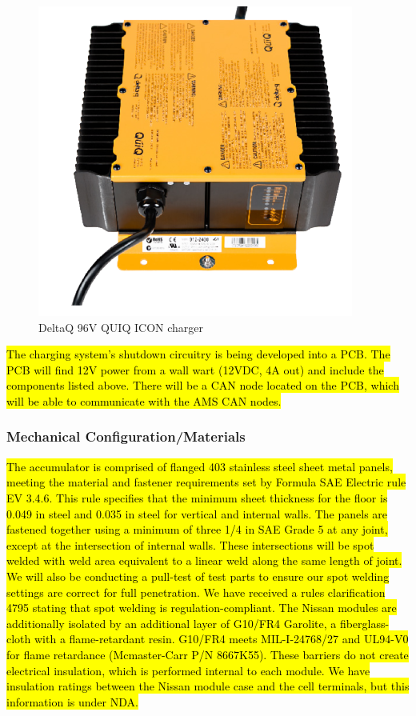 \documentclass{article}
\DeclareRobustCommand{\hlr}[1]{{\sethlcolor{red}\hl{#1}}}
\begin{document}
            \begin{figure}[H]
                \centering
                \includegraphics[width = 0.5 \textwidth]{chargepic}
                \caption{DeltaQ 96V QUIQ ICON charger}
                \label{chargepic}
            \end{figure}

            \hlr{The charging system's shutdown circuitry is being developed into a PCB. The PCB will find 12V power from a wall wart (12VDC, 4A out) and include the components listed above. There will be a CAN node located on the PCB, which will be able to communicate with the AMS CAN nodes.}

        \subsubsection{Mechanical Configuration/Materials}


            \hlr{The accumulator is comprised of flanged 403 stainless steel sheet metal panels, meeting the material and fastener requirements set by Formula SAE Electric rule EV 3.4.6. This rule specifies that the minimum sheet thickness for the floor is 0.049 in steel and 0.035 in steel for vertical and internal walls. The panels are fastened together using a minimum of three 1/4 in SAE Grade 5 at any joint, except at the intersection of internal walls. These intersections will be spot welded with weld area equivalent to a linear weld along the same length of joint. We will also be conducting a pull-test of test parts to ensure our spot welding settings are correct for full penetration. We have received a rules clarification 4795 stating that spot welding is regulation-compliant. The Nissan modules are additionally isolated by an additional layer of G10/FR4 Garolite, a fiberglass-cloth with a flame-retardant resin. G10/FR4 meets MIL-I-24768/27 and UL94-V0 for flame retardance (Mcmaster-Carr P/N 8667K55). These barriers do not create electrical insulation, which is performed internal to each module. We have insulation ratings between the Nissan module case and the cell terminals, but this information is under NDA.}
\end{document}
